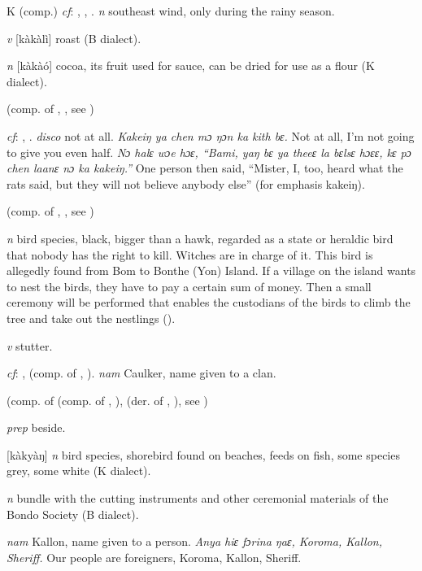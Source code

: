 \begin{letter}{K}
 (comp.) \textit{cf}: , , . \textit{n} southeast wind, only during the rainy season.

 \textit{v} [kàkàlì] roast (B dialect). 

 \textit{n} [kàkàó] cocoa, its fruit used for sauce, can be dried for use as a flour (K dialect).

 (comp. of , , see ) 

 \textit{cf}: , . \textit{disco} not at all. \textit{Kakeiŋ ya chen mɔ ŋɔn ka kith bɛ.} Not at all, I'm not going to give you even half. \textit{Nɔ halɛ wɔe hɔɛ, “Bami, yaŋ bɛ ya theeɛ la bɛlsɛ hɔɛɛ, kɛ pɔ chen laanɛ nɔ ka kakeiŋ.”} One person then said, “Mister, I, too, heard what the rats said, but they will not believe anybody else” (for emphasis kakeiŋ).

 (comp. of , , see )

 \textit{n} bird species, black, bigger than a hawk, regarded as a state or heraldic bird that nobody has the right to kill. Witches are in charge of it. This bird is allegedly found from Bom to Bonthe (Yon) Island. If a village on the island wants to nest the birds, they have to pay a certain sum of money. Then a small ceremony will be performed that enables the custodians of the birds to climb the tree and take out the nestlings (\citealt{Pichl1967}). 

 \textit{v} stutter.

 \textit{cf}: ,  (comp. of , ). \textit{nam} Caulker, name given to a clan.

 (comp. of  (comp. of , ),  (der. of , ), see ) 

 \textit{prep} beside.

 [kàkyàŋ] \textit{n} bird species, shorebird found on beaches, feeds on fish, some species grey, some white (K dialect).

 \textit{n} bundle with the cutting instruments and other ceremonial materials of the Bondo Society (B dialect). 

 \textit{nam} Kallon, name given to a person. \textit{Anya hiɛ fɔrina ŋaɛ, Koroma, Kallon, Sheriff.} Our people are foreigners, Koroma, Kallon, Sheriff.


\end{letter}
